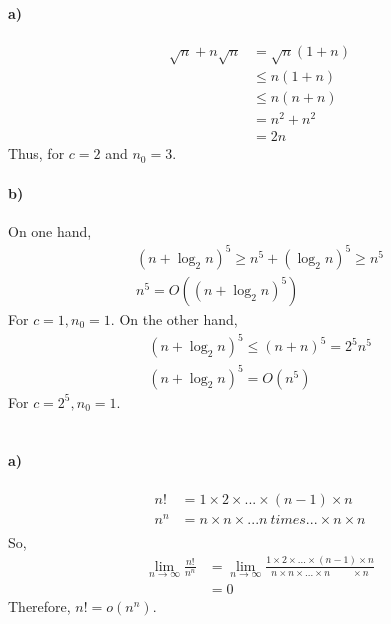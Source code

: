\documentclass[11pt,letterpaper]{article}
\begin{document}
	\section{}
	
		\paragraph{a)}
		\begin{align*}
		\sqrt{n} + n\sqrt{n} &= \sqrt{n} (1+n) \\
		&\leq n(1+n) \\
		&\leq n(n+n) \\
		&= n^2 + n^2 \\
		&= 2n
		\end{align*}
		Thus, for $c = 2$ and $n_0 = 3$.
		
		\paragraph{b)}
		On one hand,
		\begin{align*}
		(n + \log_2 n)^5 \geq n^5 + (\log_2 n)^5 \geq n^5 \\
		n^5 = O((n + \log_2 n)^5)
		\end{align*}
		For $c = 1, n_0 = 1$.
		On the other hand,
		\begin{align*}
		(n + \log_2 n)^5 \leq (n+n)^5 = 2^5 n^5 \\
		(n + \log_2 n)^5 = O(n^5)
		\end{align*}
		For $c = 2^5, n_0 = 1$.
		
	\section{}
	
		\paragraph{a)}
		\begin{align*}
		n! &= 1 \times 2 \times ... \times (n-1) \times n \\
		n^n &= n \times n \times ...n\ times... \times n \times n \\
		\end{align*}
		So,
		\begin{align*}
		\lim\limits_{n\to\infty}\frac{n!}{n^n} &= \lim\limits_{n\to\infty}\frac{1 \times 2 \times ... \times (n-1) \times n}{n \times n \times ... \times n\qquad\ \times n} \\
		&= 0
		\end{align*}
		Therefore, $n! = o(n^n)$.
		
\end{document}
